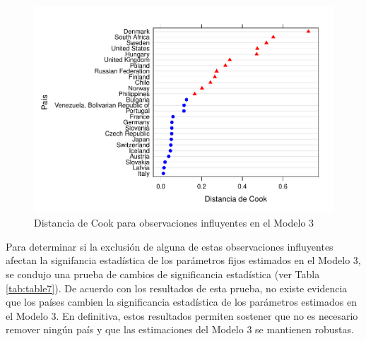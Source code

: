 \documentclass[
  12pt,
  a4paper,
]{article}
\begin{document}
\begin{figure}

{\centering \includegraphics[width=0.9\linewidth]{03-guia_files/figure-latex/fig4-1} 

}

\caption{Distancia de Cook para observaciones influyentes en el Modelo 3}\label{fig:fig4}
\end{figure}

Para determinar si la exclusión de alguna de estas observaciones influyentes afectan la signifancia estadística de los parámetros fijos estimados en el Modelo 3, se condujo una prueba de cambios de significancia estadística (ver Tabla \ref{tab:table7}). De acuerdo con los resultados de esta prueba, no existe evidencia que los países cambien la significancia estadística de los parámetros estimados en el Modelo 3. En definitiva, estos resultados permiten sostener que no es necesario remover ningún país y que las estimaciones del Modelo 3 se mantienen robustas.
\end{document}
